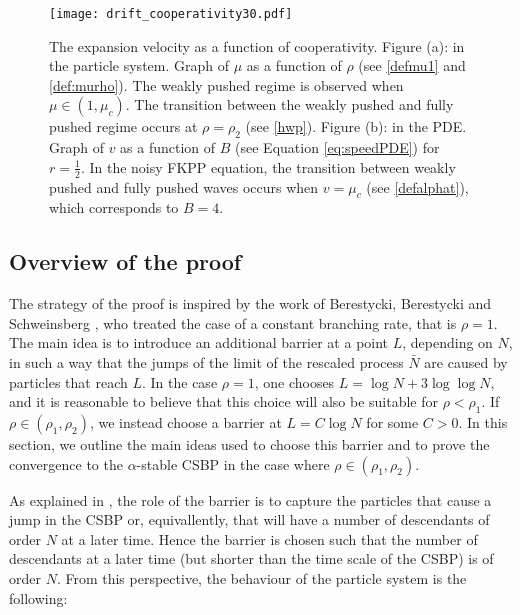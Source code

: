 \documentclass[11pt]{article}
\theoremstyle{plain}
\begin{document}
\begin{figure}[h]
\begin{center}
\captionsetup{width=.9\linewidth}
 \texttt{[image: drift\_cooperativity30.pdf]}\\
\caption[]{The expansion velocity as a function of cooperativity. Figure (a): in the particle system. Graph of $\mu$ as a function of $\rho$ (see \eqref{defmu1} and \eqref{def:murho}).  The weakly pushed regime is observed when $\mu\in(1,\mu_c)$. The transition between the weakly pushed and fully pushed regime occurs at $\rho=\rho_2$ (see \eqref{hwp}).  Figure (b): in the PDE. Graph of $v$ as a function of $B$ (see Equation \eqref{eq:speedPDE}) for $r=\frac{1}{2}$. In the noisy FKPP equation, the transition between weakly pushed and fully pushed waves occurs when $v=\mu_c$ (see \eqref{defalphat}), which corresponds to $B=4$. } 
\label{fig:semipushed}
\end{center}
\end{figure}








\subsection{Overview of the proof}\label{sec:skproof}

The strategy of the proof is inspired by the work of Berestycki, Berestycki and Schweinsberg \cite{Berestycki2010}, who treated the case of a constant branching rate,   that is $\rho=1$. The main idea  is to introduce an additional barrier at a point $L$, depending on $N$, in such a way that the jumps of the limit of the rescaled process $\bar{N}$ are caused by particles that reach $L$.  In the case $\rho=1$, one chooses $L = \log N + 3\log \log N$, and it is reasonable to believe that this choice will also be suitable  for $\rho < \rho_1$. If $\rho \in (\rho_1,\rho_2)$, we instead choose a barrier at $L = C \log N $ for some $C>0$. In this section, we outline the main ideas used to choose this barrier and to prove the convergence to the $\alpha$-stable CSBP in the case where $\rho\in(\rho_1,\rho_2)$. 


As explained in \cite{Berestycki2010}, the role of the barrier is to capture the particles that cause a jump in the CSBP or, equivallently, that will have a number of descendants of order $N$ at a later time. Hence the barrier is chosen such that the number of descendants at a later time (but shorter than the time scale of the CSBP) is of order $N$. From this perspective, the behaviour of the particle system is the following: 
\end{document}
